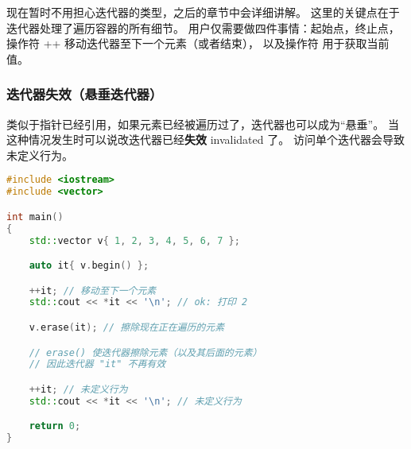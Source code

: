 \documentclass[../../LearnCpp.tex]{subfiles}
\begin{document}
现在暂时不用担心迭代器的类型，之后的章节中会详细讲解。
这里的关键点在于迭代器处理了遍历容器的所有细节。
用户仅需要做四件事情：起始点，终止点，操作符 ++ 移动迭代器至下一个元素（或者结束），
以及操作符 \* 用于获取当前值。

\subsubsection*{迭代器失效（悬垂迭代器）}

类似于指针已经引用，如果元素已经被遍历过了，迭代器也可以成为“悬垂”。
当这种情况发生时可以说改迭代器已经\textbf{失效} invalidated 了。
访问单个迭代器会导致未定义行为。

\begin{lstlisting}[language=C++]
#include <iostream>
#include <vector>

int main()
{
    std::vector v{ 1, 2, 3, 4, 5, 6, 7 };

    auto it{ v.begin() };

    ++it; // 移动至下一个元素
    std::cout << *it << '\n'; // ok: 打印 2

    v.erase(it); // 擦除现在正在遍历的元素

    // erase() 使迭代器擦除元素（以及其后面的元素）
    // 因此迭代器 "it" 不再有效

    ++it; // 未定义行为
    std::cout << *it << '\n'; // 未定义行为

    return 0;
}
\end{lstlisting}
\end{document}
